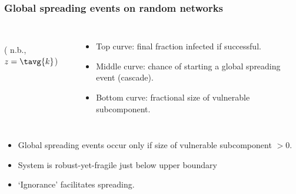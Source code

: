 



\begin{frame}
  \frametitle{Global spreading events on random networks}

  \begin{columns}
    \setlength\fboxsep{0pt}
    \setlength\fboxrule{0.5pt}
    \\
    \small{( n.b., $z = \tavg{k}$)}
    \begin{itemize}
    \item<1->
      \alert{Top curve:} final fraction infected if successful.
    \item<3->
      \alert{Middle curve:} chance of starting a global spreading event (cascade).
    \item<2-> 
      \alert{Bottom curve:} fractional size of vulnerable subcomponent.\cite{watts2002a}
    \end{itemize}
  \end{columns}

  \begin{itemize}
  \item<4-> 
    Global spreading events occur only if size of vulnerable subcomponent $>0$.\\
  \item<5-> 
    System is robust-yet-fragile just below upper boundary\cite{carlson1999a,carlson2000a,sornette2003a}
  \item<6-> 
    `Ignorance' facilitates spreading.
  \end{itemize}

\end{frame}

